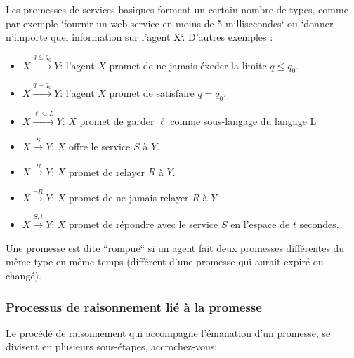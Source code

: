 Les promesses de services basiques forment un certain nombre de types, comme par
exemple `fournir un web service en moins de 5 millisecondes` ou `donner
n'importe quel information sur l'agent X`. D'autres exemples :

\begin{itemize}
    \item $X \xrightarrow{q \leq q_0} Y $: l'agent $X$ promet de ne jamais éxeder la
        limite $q \leq q_0$.
    \item $X \xrightarrow{q = q_0} Y $: l'agent $X$ promet de satisfaire
        $q = q_0$.
    \item $X \xrightarrow{\ell \subseteq  L} Y $: $X$ promet de garder $\ell$
        comme sous-langage du langage L
    \item $X \xrightarrow{S} Y $: $X$ offre le service $S$ à $Y$.
    \item $X \xrightarrow{R} Y $: $X$ promet de relayer $R$ à $Y$.
    \item $X \xrightarrow{\neg R} Y $: $X$ promet de ne jamais relayer $R$ à $Y$.
    \item $X \xrightarrow{S,t} Y $: $X$ promet de répondre avec le service $S$
        en l'espace de $t$ secondes.
\end{itemize}

Une promesse est dite ``rompue`` si un agent fait deux promesses différentes du
même type en même temps (différent d'une promesse qui aurait expiré ou changé).

\subsubsection{Processus de raisonnement lié à la promesse}

Le procédé de raisonnement qui accompagne l'émanation d'un promesse, se divisent
en plusieurs sous-étapes, accrochez-vous:

